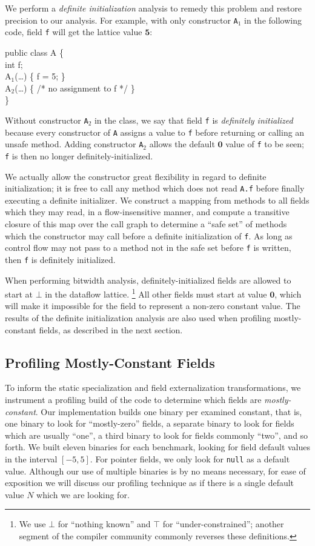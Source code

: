 \documentclass{acmconf}
\begin{document}
We perform a {\it definite initialization} analysis to remedy this
problem and restore precision to our analysis.
For example, with only constructor {\tt A$_1$} in the following code,
field {\tt f} will get the lattice value $\mathbf{5}$:
{\small\renewcommand{\baselinestretch}{0.5}\begin{samplecode}
public class A \{\\
\>int f;\\
\>A$_1$(\ldots) \{ f = 5; \}\\
\>A$_2$(\ldots) \{ /* no assignment to f */ \}\\
\}
\end{samplecode}%
}
Without constructor {\tt A$_2$} in the class,
we say that field {\tt f} is {\it definitely initialized} because
every constructor of {\tt A} assigns a value to {\tt f} before
returning or calling an unsafe method.
Adding constructor {\tt A$_2$} allows the
default $\mathbf{0}$ value of {\tt f} to be seen; {\tt f} is then no longer
definitely-initialized.

We actually allow the constructor great flexibility in regard to
definite initialization; it is free to call any method which does not
read {\tt A.f} before finally executing a definite initializer.
We construct a mapping from methods to all
fields which they may read, in a flow-insensitive manner, and compute
a transitive closure of this map over the call graph to determine 
a ``safe set'' of
methods which the constructor may call before a definite
initialization of {\tt f}.  As long as control flow may not pass to a
method not in the safe set before {\tt f} is written, then {\tt f} is
definitely initialized.

When performing bitwidth analysis,
definitely-initialized fields are allowed to start at $\bot$ in the
dataflow lattice.%
\footnote{We use $\bot$ for ``nothing known'' and $\top$ for
  ``under-constrained''; another segment of the compiler community
  commonly reverses these definitions.\label{ft:topbot}}
  All other fields must start at value
$\mathbf{0}$, which will make it impossible for the field to represent a
non-zero constant value.  The results of the definite initialization
analysis are also used when profiling mostly-constant fields, as described
in the next section.
%
\subsection{Profiling Mostly-Constant Fields}
To inform the static specialization and field externalization
transformations, we instrument a profiling build of the code
to determine which fields are {\it mostly-constant}.  Our implementation
builds one binary per examined constant, that is, one binary to look
for ``mostly-zero'' fields, a separate binary to look for fields which
are usually ``one'', a third binary to look for fields commonly
``two'', and so forth.  We built eleven binaries for each benchmark,
looking for
field default values in the interval $[-5,5]$.
For pointer fields, we only look for {\tt null} as a default value.
Although our use of multiple binaries is by no means necessary,
for ease of exposition we will discuss our profiling technique
as if there is a single default value $N$ which we are looking for.
\end{document}
